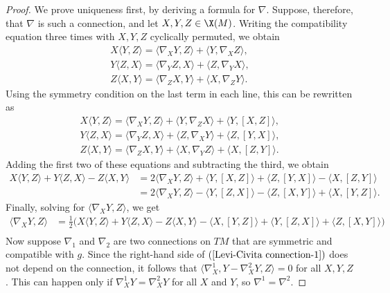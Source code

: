 \begin{proof}
We prove uniqueness first, by deriving a formula for $\nabla$. Suppose, therefore, that $\nabla$ is such a connection, and let $X,Y,Z\in\X(M)$. Writing the compatibility equation three times with $X,Y,Z$ cyclically permuted, we obtain
\begin{align*}
X\langle Y,Z\rangle=\langle\nabla_XY,Z\rangle+\langle Y,\nabla_XZ\rangle,\\
Y\langle Z,X\rangle=\langle\nabla_YZ,X\rangle+\langle Z,\nabla_YX\rangle,\\
Z\langle X,Y\rangle=\langle\nabla_ZX,Y\rangle+\langle X,\nabla_ZY\rangle.
\end{align*}
Using the symmetry condition on the last term in each line, this can be rewritten as
\begin{align*}
X\langle Y,Z\rangle=\langle\nabla_XY,Z\rangle+\langle Y,\nabla_ZX\rangle+\langle Y,[X,Z]\rangle,\\
Y\langle Z,X\rangle=\langle\nabla_YZ,X\rangle+\langle Z,\nabla_XY\rangle+\langle Z,[Y,X]\rangle,\\
Z\langle X,Y\rangle=\langle\nabla_ZX,Y\rangle+\langle X,\nabla_YZ\rangle+\langle X,[Z,Y]\rangle.
\end{align*}
Adding the first two of these equations and subtracting the third, we obtain
\begin{align*}
X\langle Y,Z\rangle+Y\langle Z,X\rangle-Z\langle X,Y\rangle&=2\langle\nabla_XY,Z\rangle+\langle Y,[X,Z]\rangle+\langle Z,[Y,X]\rangle-\langle X,[Z,Y]\rangle\\
&=2\langle\nabla_XY,Z\rangle-\langle Y,[Z,X]\rangle-\langle Z,[X,Y]\rangle+\langle X,[Y,Z]\rangle.
\end{align*}
Finally, solving for $\langle\nabla_XY,Z\rangle$, we get
\begin{equation}\label{Levi-Civita connection-1}
\begin{aligned}
\langle\nabla_XY,Z\rangle&=\frac{1}{2}\big(X\langle Y,Z\rangle+Y\langle Z,X\rangle-Z\langle X,Y\rangle-\langle X,[Y,Z]\rangle+\langle Y,[Z,X]\rangle+\langle Z,[X,Y]\rangle\big)\\
\end{aligned}
\end{equation}
Now suppose $\nabla_1$ and $\nabla_2$ are two connections on $TM$ that are symmetric and compatible with $g$. Since the right-hand side of $(\ref{Levi-Civita connection-1})$ does not depend on the connection, it follows that $\langle\nabla^1_X,Y-\nabla^2_XY,Z\rangle=0$ for all $X,Y,Z$. This can happen only if $\nabla^1_XY=\nabla^2_XY$ for all $X$ and $Y$, so $\nabla^1=\nabla^2$.\par

\end{proof}
